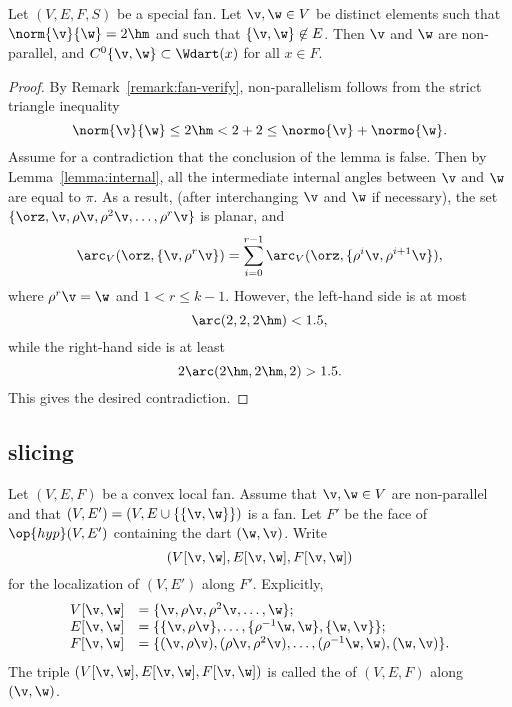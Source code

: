\begin{lemma}[]\label{lemma:2hm-slice}
Let $(V,E,F,S)$ be a special fan.  Let $\v,\w\in V$ be distinct
elements such that $\norm{\v}{\w}=2\hm$ and such that
$\{\v,\w\}\not\in E$.  Then $\v$ and $\w$ are non-parallel, and
$C^0\{\v,\w\}\subset \Wdart(x)$ for all $x\in F$.
\end{lemma}

\begin{proof} By Remark~\ref{remark:fan-verify}, non-parallelism follows
from the strict triangle inequality
\begin{displaymath}
\norm{\v}{\w} \le 2\hm < 2 + 2 \le \normo{\v} + \normo{\w}.
\end{displaymath}
Assume for a contradiction that the conclusion of the lemma is false.
Then by Lemma~\ref{lemma:internal}, all the intermediate internal
angles between $\v$ and $\w$ are equal to $\pi$.  As a result, (after
interchanging $\v$ and $\w$ if necessary), the set
$\{\orz,\v,\rho\v,\rho^2\v,\ldots,\rho^r\v\}$ is planar, and
\begin{displaymath}
  \arc_V(\orz,\{\v,\rho^r\v\}) 
= \sum_{i=0}^{r-1} \arc_V(\orz,\{\rho^i\v,\rho^{i+1}\v\}),
\end{displaymath}
where $\rho^r \v = \w$ and $1 < r \le k-1$.
However, the left-hand side is at most
\begin{displaymath}
\arc(2,2,2\hm) < 1.5,
\end{displaymath}
while the right-hand side is at least
\begin{displaymath}
2\arc(2\hm,2\hm,2) > 1.5.
\end{displaymath}
This gives the desired contradiction.
\end{proof}

\subsection{slicing}

\begin{definition}[slice]
 Let $(V,E,F)$ be a convex local fan.  Assume that
$\v,\w\in V$ are non-parallel and that $(V,E')=(V,E\cup
\{\{\v,\w\}\})$ is a fan.  Let $F'$ be the face of $\op{hyp}(V,E')$
containing the dart $(\w,\v)$.  Write
\begin{displaymath}(V[\v,\w],E[\v,\w],F[\v,\w])\end{displaymath}
for the localization of $(V,E')$ along $F'$.  Explicitly,
\begin{displaymath}
\begin{array}{lll}
  V[\v,\w] &= \{\v,\rho \v,\rho^2 \v,\ldots,\w\};\\
  E[\v,\w] &= \{\{\v,\rho \v\},\ldots,\{\rho^{-1}\w,\w\},\{\w,\v\}\};\\
  F[\v,\w] &= \{(\v,\rho \v),(\rho \v,\rho^2 \v),
 \ldots,(\rho^{-1}\w,\w),(\w,\v)\}.
\end{array}
\end{displaymath}
The triple $(V[\v,\w],E[\v,\w],F[\v,\w])$ is called the
 of $(V,E,F)$ along $(\v,\w)$.
\end{definition}
%

